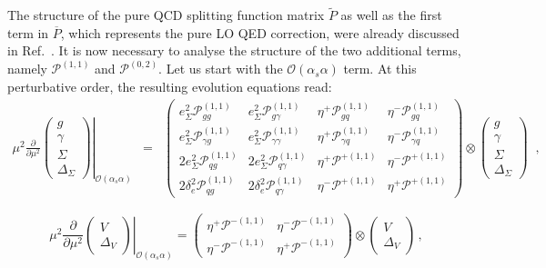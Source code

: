 The structure of the pure QCD splitting function matrix
$\widetilde{P}$ as well as the first term in $\overline{P}$, which
represents the pure LO QED correction, were already discussed in
Ref.~\cite{Bertone:2015lqa}.
%
It is now necessary to analyse the structure of the two additional
terms, namely $\mathcal{P}^{(1,1)}$ and $\mathcal{P}^{(0,2)}$.
%
Let us start with the $\mathcal{O}(\alpha_s\alpha)$ term.
%
At this perturbative order, the resulting evolution equations read:
\begin{equation}
\begin{array}{rcl}
\displaystyle\left.\mu^2\frac{\partial}{\partial \mu^2}
\begin{pmatrix}
g\\
\gamma\\
\Sigma\\
\Delta_\Sigma
\end{pmatrix}
\right|_{\mathcal{O}(\alpha_s \alpha)} &=& \displaystyle \begin{pmatrix}
e_\Sigma^2 \mathcal{P}^{(1,1)}_{gg}      & e_\Sigma^2 \mathcal{P}^{(1,1)}_{g\gamma} & \eta^+\mathcal{P}^{(1,1)}_{gq} & \eta^-\mathcal{P}^{(1,1)}_{gq} \\
e_\Sigma^2 \mathcal{P}^{(1,1)}_{\gamma g} & e_\Sigma^2 \mathcal{P}^{(1,1)}_{\gamma\gamma} & \eta^+\mathcal{P}^{(1,1)}_{\gamma q} &\eta^-\mathcal{P}^{(1,1)}_{\gamma q} \\
2 e_\Sigma^2 \mathcal{P}^{(1,1)}_{qg}    & 2 e_\Sigma^2 \mathcal{P}^{(1,1)}_{q\gamma} & \eta^+\mathcal{P}^{+(1,1)}  & \eta^-\mathcal{P}^{+(1,1)}\\
2 \delta_e^2 \mathcal{P}^{(1,1)}_{qg} & 2 \delta_e^2 \mathcal{P}^{(1,1)}_{q\gamma} &\eta^-\mathcal{P}^{+(1,1)} &\eta^+\mathcal{P}^{+(1,1)}
\end{pmatrix}\otimes
\begin{pmatrix}
g\\
\gamma\\
\Sigma\\
\Delta_\Sigma
\end{pmatrix}
\end{array}\,,
\end{equation}

\begin{equation}
\displaystyle\left.\mu^2\frac{\partial}{\partial \mu^2}
\begin{pmatrix}
V\\
\Delta_V
\end{pmatrix} \right|_{\mathcal{O}(\alpha_s \alpha)}= 
\begin{pmatrix}
\eta^+\mathcal{P}^{-(1,1)} & \eta^-\mathcal{P}^{-(1,1)} \\
\eta^-\mathcal{P}^{-(1,1)} & \eta^+\mathcal{P}^{-(1,1)} 
\end{pmatrix}\otimes
\begin{pmatrix}
V\\
\Delta_V
\end{pmatrix}\,,
\end{equation}

